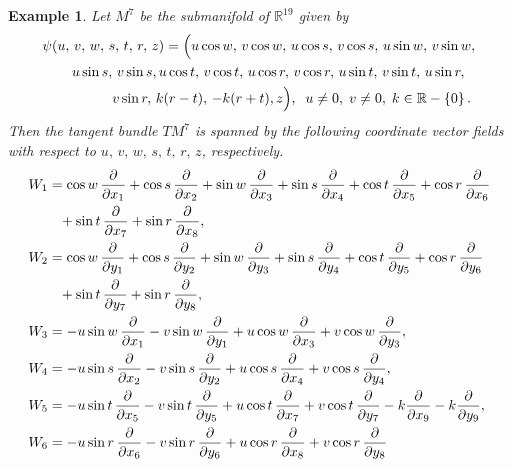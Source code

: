 \documentclass[reqno]{amsart}
\theoremstyle{plain}
\newtheorem{example}{Example}[section]
\theoremstyle{remark}
\numberwithin{equation}{section}
\begin{document}
\begin{example}
{Let $M^{7}$ be the submanifold of ${\mathbb{R}}^{19}$ given by 
\begin{equation}\begin{aligned}\label{7.2}
\psi(u,\, v,\, w,\, s,\, t,\, r,\, z)=\; &\Big(u\cos w,\, v\cos w,\, u\cos s,\, v\cos s,\,u\sin w,\, v\sin w,\, \\
&\hskip-1.1in  u\sin s,\, v\sin s, u\cos t,\, v\cos t,\, u\cos r,\,v\cos r,\, u\sin t,\, v\sin t,\, u\sin r,\,\\
&\hskip-.7in   v\sin r,\,k(r-t),\, -k(r+t), z\Big), \;\; u\neq 0,\; v\neq 0,\; k\in\mathbb{R}-\left\lbrace 0 \right\rbrace.
\end{aligned}\end{equation}
Then the tangent bundle $TM^{7}$ is spanned by the following coordinate vector fields with respect to $u,\, v,\, w,\, s,\, t,\, r,\, z$, respectively.
\begin{align}\notag
&W_1=\cos w\,\frac{\partial}{\partial x_1}+\cos s\,\frac{\partial}{\partial x_2}+\sin w\,\frac{\partial}{\partial x_3}+\sin s\,\frac{\partial}{\partial x_4}+\cos t\,\frac{\partial}{\partial x_5}+\cos r\,\frac{\partial}{\partial x_6}
\\&\notag\hskip.3in +\sin t\,\frac{\partial}{\partial x_7}+\sin r\,\frac{\partial}{\partial x_8},\\
&\notag W_2=\cos w\,\frac{\partial}{\partial y_1}+\cos s\,\frac{\partial}{\partial y_2}+\sin w\,\frac{\partial}{\partial y_3}+\sin s\,\frac{\partial}{\partial y_4}+\cos t\,\frac{\partial}{\partial y_5} +\cos r\,\frac{\partial}{\partial y_6}\\&\notag\hskip.3in+\sin t\,\frac{\partial}{\partial y_7}+\sin r\,\frac{\partial}{\partial y_8},\\
&\label{7.3} W_3=-u\sin w\,\frac{\partial}{\partial x_1}-v\sin w\,\frac{\partial}{\partial y_1}+u\cos w\,\frac{\partial}{\partial x_3}+v\cos w\,\frac{\partial}{\partial y_3},\\
 &\notag W_4=-u\sin s\,\frac{\partial}{\partial x_2}-v\sin s\,\frac{\partial}{\partial y_2}+u\cos s\,\frac{\partial}{\partial x_4}+v\cos s\,\frac{\partial}{\partial y_4},\\
&\notag W_5=-u\sin t\,\frac{\partial}{\partial x_5}-v\sin t\,\frac{\partial}{\partial y_5}+u\cos t\,\frac{\partial}{\partial x_7}+v\cos t\,\frac{\partial}{\partial y_7}
 -k\frac{\partial}{\partial x_9}-k\frac{\partial}{\partial y_9},\\
&\notag W_6=-u\sin r\,\frac{\partial}{\partial x_6}-v\sin r\,\frac{\partial}{\partial y_6}+u\cos r\,\frac{\partial}{\partial x_8}+v\cos r\,\frac{\partial}{\partial y_8}

\end{align}}
\end{example}
\end{document}
